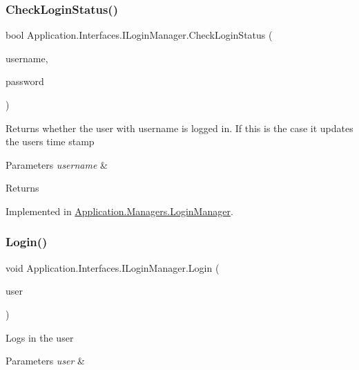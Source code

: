 \subsubsection{\texorpdfstring{Check\+Login\+Status()}{CheckLoginStatus()}}
{\footnotesize\ttfamily bool Application.\+Interfaces.\+I\+Login\+Manager.\+Check\+Login\+Status (\begin{DoxyParamCaption}\item[{string}]{username,  }\item[{string}]{password }\end{DoxyParamCaption})}



Returns whether the user with username is logged in. If this is the case it updates the users time stamp 


\begin{DoxyParams}{Parameters}
{\em username} & \\
\hline
\end{DoxyParams}
\begin{DoxyReturn}{Returns}

\end{DoxyReturn}


Implemented in \mbox{\hyperlink{class_application_1_1_managers_1_1_login_manager_ab485bd570a5d994461c54eb07e97a43a}{Application.\+Managers.\+Login\+Manager}}.

\mbox{\label{interface_application_1_1_interfaces_1_1_i_login_manager_abfad12b55f211087464278f6301ba2e6}} 
\subsubsection{\texorpdfstring{Login()}{Login()}}
{\footnotesize\ttfamily void Application.\+Interfaces.\+I\+Login\+Manager.\+Login (\begin{DoxyParamCaption}\item[{I\+User}]{user }\end{DoxyParamCaption})}



Logs in the user 


\begin{DoxyParams}{Parameters}
{\em user} & \\
\hline
\end{DoxyParams}


